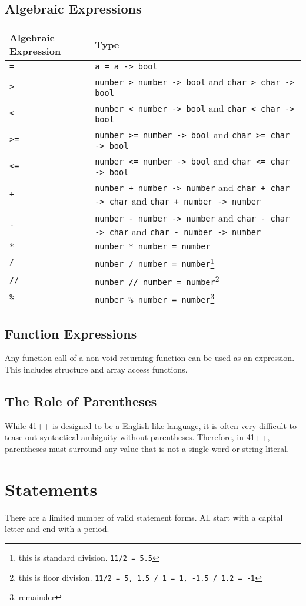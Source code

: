 \documentclass{article}
\newcommand{\code}[1]{\texttt{#1}}
\begin{document}
\subsection{Algebraic Expressions}
\begin{tabular}{|l|p{10cm}|}
\hline
Algebraic Expression & Type\\
\hline
\code{=} & \code{a = a -> bool}\\
\hline
\code{>} & \code{number > number -> bool} and \code{char > char -> bool}\\
\hline
\code{<} & \code{number < number -> bool} and \code{char < char -> bool}\\
\hline
\code{>=}& \code{number >= number -> bool} and \code{char >= char -> bool}\\
\hline
\code{<=} & \code{number <= number -> bool} and \code{char <= char -> bool}\\
\hline
\code{+}& \code{number + number -> number} and \code{char + char -> char} and \code{char + number -> number}\\
\hline
\code{-} & \code{number - number -> number} and \code{char - char -> char} and \code{char - number -> number}\\
\hline
\code{*} & \code{number * number = number}\\
\hline
\code{/} & \code{number / number = number}\footnote{this is standard division. \code{11/2 = 5.5}}\\
\hline
\code{//} & \code{number // number = number}\footnote{this is floor division. \code{11/2 = 5, 1.5 / 1 = 1, -1.5 / 1.2 = -1}}\\
\hline
\code{\%} & \code{number \% number = number}\footnote{remainder}\\
\hline
\end{tabular}
\subsection{Function Expressions}
Any function call of a non-void returning function can be used as an expression. This includes structure and array access functions.
\subsection{The Role of Parentheses}
While 41++ is designed to be a English-like language, it is often very difficult to tease out syntactical ambiguity without parentheses. Therefore, in 41++, parentheses must surround any value that is not a single word or string literal.
\section{Statements}
There are a limited number of valid statement forms. All start with a capital letter and end with a period.
\end{document}

